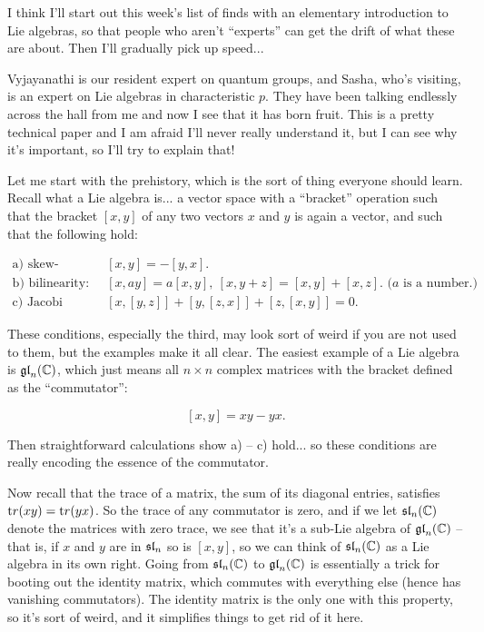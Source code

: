 
I think I'll start out this week's list of finds with an elementary introduction to Lie algebras, so that people who aren't ``experts'' can get the drift of what these are about.  Then I'll gradually pick up speed... 


Vyjayanathi is our resident expert on quantum groups, and Sasha, who's visiting, is an expert on Lie algebras in characteristic $p$.  They have been talking endlessly across the hall from me and now I see that it has born fruit.  This is a pretty technical paper and I am afraid I'll never really understand it, but I can see why it's important, so I'll try to explain that!

Let me start with the prehistory, which is the sort of thing everyone should learn.  Recall what a Lie algebra is... a vector space with a ``bracket'' operation such that the bracket $[x,y]$ of any two vectors $x$ and $y$ is again a vector, and such that the following hold:

\[\begin{array}{ll}
\text{a) skew-symmetry: }   & [x,y] = -[y,x].\\
\text{b) bilinearity: }     & [x,ay] = a[x,y], \ [x,y+z] = [x,y] + [x,z]\text{.  ($a$ is a number.)}\\
\text{c) Jacobi identity: } & [x,[y,z]] + [y,[z,x]] + [z,[x,y]] = 0.
\end{array}\]

These conditions, especially the third, may look sort of weird if you are not used to them, but the examples make it all clear.  The easiest example of a Lie algebra is $\mathfrak{gl}_n(\mathbb C)$, which just means all $n\times n$ complex matrices with the bracket defined as the ``commutator'': 

\[[x,y] = xy - yx.\]  

Then straightforward calculations show a) -- c) hold... so these conditions are really encoding the essence of the commutator.

Now recall that the trace of a matrix, the sum of its diagonal entries, satisfies ${\mathrm tr}(xy) = {\mathrm tr}(yx)$.  So the trace of any commutator is zero, and if we let $\mathfrak{sl}_n(\mathbb C)$ denote the matrices with zero trace, we see that it's a sub-Lie algebra of $\mathfrak{gl}_n(\mathbb C)$ -- that is, if $x$ and $y$ are in $\mathfrak{sl}_n$ so is $[x,y]$, so we can think of $\mathfrak{sl}_n(\mathbb C)$ as a Lie algebra in its own right.  Going from $\mathfrak{sl}_n(\mathbb C)$ to $\mathfrak{gl}_n(\mathbb C)$ is essentially a trick for booting out the identity matrix, which commutes with everything else (hence has vanishing commutators).  The identity matrix is the only one with this property, so it's sort of weird, and it simplifies things to get rid of it here.

